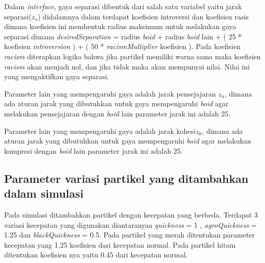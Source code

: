 Dalam \emph{interface}, gaya separasi dibentuk dari salah satu variabel yaitu jarak separasi($z_s$) didalamnya dalam  terdapat koefisien introversi dan koefisien rasis dimana koefisien ini membentuk radius maksimum untuk melakukan gaya separasi dimana \emph{desiredSeparation} = radius \emph{boid} + radius \emph{boid} lain + ( 25 * koefisien \emph{introversion} ) + ( 50 * \emph{racismMultiplier} koefisien ). Pada koefisien \emph{racism} diterapkan logika bahwa jika partikel memiliki warna sama maka koefisien \emph{racism} akan menjadi nol, dan jika tidak maka akan mempunyai nilai. Nilai ini yang mengaktifkan gaya separasi.

Parameter lain yang mempengaruhi gaya adalah jarak pensejajaran $z_a$, dimana ada aturan jarak yang dibutuhkan untuk gaya mempengaruhi \emph{boid} agar melakukan pensejajaran dengan \emph{boid} lain parameter jarak ini adalah 25.

Parameter lain yang mempengaruhi gaya adalah jarak kohesi$z_k$, dimana ada aturan jarak yang dibutuhkan untuk gaya mempengaruhi \emph{boid} agar melakukan kompresi dengan \emph{boid} lain parameter jarak ini adalah 25.
\subsection{Parameter variasi partikel yang ditambahkan dalam simulasi}
Pada simulasi ditambahkan partikel dengan kecepatan yang berbeda. Terdapat 3 variasi kecepatan yang digunakan diantaranyaa \emph{quickness} = 1 , \emph{agroQuickness} = 1.25 dan \emph{blackQuickness} = 0.5. Pada partikel yang merah ditentukan parameter kecepatan yang 1.25 koefisien dari kecepatan normal. Pada partikel hitam ditentukan koefisien nya yaitu 0.45 dari kecepatan normal.




%